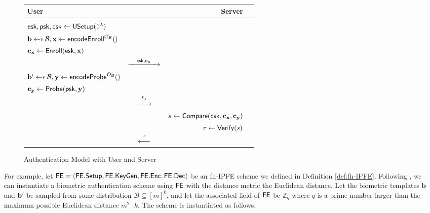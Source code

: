 \begin{figure}[]
	\begin{center}
		\begin{tabular}{l c r c}
			{\bf User} & 	& {\bf Server} \\

			\hline

			\\

			${\sf esk}, {\sf psk}, {\sf csk} \gets {\sf USetup}(1^\lambda)$ \\

			$ \mathbf{b} \getsdollar \mathcal{B}, \mathbf{x} \gets {\sf encodeEnroll}^{\mathcal{O}_{\mathcal{B}}}()$ \\

			$\mathbf{c_x} \gets {\sf Enroll}({\sf esk}, \mathbf{x})$ \\

			& $\xrightarrow{\quad {\sf csk}, \mathbf{c_x} \quad}$ \\

			$ \mathbf{b'} \getsdollar \mathcal{B}, \mathbf{y} \gets {\sf encodeProbe}^{\mathcal{O}_{\mathcal{B}}}()$ \\

			$\mathbf{c_y} \gets {\sf Probe}({\sf psk}, \mathbf{y})$ \\

			& $\xrightarrow{\quad \mathbf{c_y} \quad}$ \\
			
			&  & $s \gets {\sf Compare} ({\sf csk}, \mathbf{c_x}, \mathbf{c_y})$ \\

			& & $r \gets {\sf Verify}(s) $ \\

			& $\xleftarrow{\quad r \quad}$ & 
		\end{tabular}
	\end{center}
	\caption{Authentication Model with User and Server}
	\label{table:model}
\end{figure}


For example, let ${\sf FE} = ({\sf FE.Setup}, {\sf FE.KeyGen}, {\sf FE.Enc}, {\sf FE.Dec})$ be an fh-IPFE scheme we defined in Definition \ref{def:fh-IPFE}. Following \cite{cryptoeprint:2023/481}, we can instantiate a biometric authentication scheme using ${\sf FE}$ with the distance metric the Euclidean distance. Let the biometric templates $\mathbf{b}$ and $\mathbf{b'}$ be sampled from some distribution $\mathcal{B} \subseteq [m]^k$, and let the associated field of ${\sf FE}$ be $\mathbb{Z}_q$ where $q$ is a prime number larger than the maximum possible Euclidean distance $m^2 \cdot k$. The scheme is instantiated as follows.

